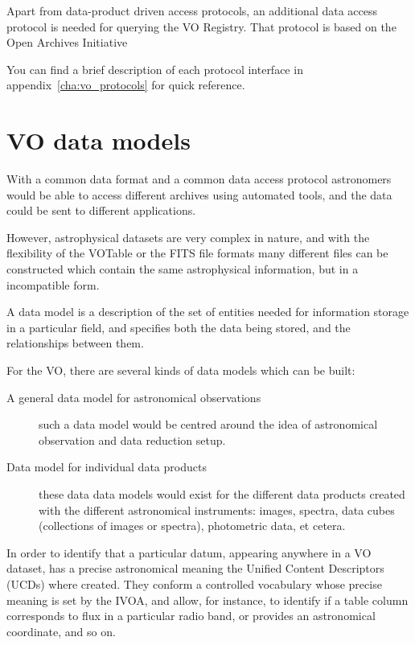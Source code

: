		 Apart from data-product driven access protocols, an
		additional data access protocol is needed for querying the
		VO Registry. That protocol is based on the Open Archives
		Initiative
		
		 You can find a brief description of each protocol
		interface in appendix~\ref{cha:vo_protocols} for quick
		reference.
		

	\section{VO data models} %
	\label{sec:vo_data_models}
		
		With a common data format and a common data access protocol
		astronomers would be able to access different archives
		using automated tools, and the data could be sent to
		different applications.
		
		 However, astrophysical datasets are very complex in
		nature, and with the flexibility of the VOTable or the FITS
		file formats many different files can be constructed which
		contain the same astrophysical information, but in a
		incompatible form.
		
		 A data model is a description of the set of entities
		needed for information storage in a particular field, and
		specifies both the data being stored, and the relationships
		between them.
		
		 For the VO, there are several kinds of data models which
		can be built:
		
		\begin{description}
			\item[A general data model for astronomical
			observations] such a data model would be centred around
			the idea of astronomical observation and data reduction
			setup.
			
			 \item[Data model for individual data products] these
			data data models would exist for the different data
			products created with the different astronomical
			instruments: images, spectra, data cubes (collections
			of images or spectra), photometric data, et cetera.
		\end{description}
		
		In order to identify that a particular datum, appearing
		anywhere in a VO dataset, has a precise astronomical
		meaning the Unified Content Descriptors (UCDs) where
		created. They conform a controlled vocabulary whose precise
		meaning is set by the IVOA, and allow, for instance, to
		identify if a table column corresponds to flux in a
		particular radio band, or provides an astronomical
		coordinate, and so on.
		
